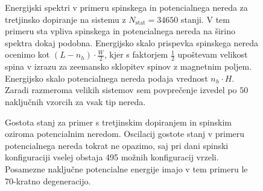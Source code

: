\documentclass[10pt,a4paper]{article}
\begin{document}
 \begin{figure}[H]
\caption{Energijski spektri v primeru spinskega in potencialnega nereda za tretjinsko dopiranje na sistemu z $N_\mathrm{stat}=34650$ stanji. V tem primeru sta vpliva spinskega in potencialnega nereda na širino spektra dokaj podobna. Energijsko skalo prispevka spinskega nereda ocenimo kot $(L-n_h)\cdot \frac{W}{2}$, kjer s faktorjem $\frac{1}{2}$ upoštevam velikost spina v izrazu za zeemansko sklopitev spinov z magnetnim poljem. Energijsko skalo potencialnega nereda podaja vrednost $n_h\cdot H$. Zaradi razmeroma velikih sistemov sem povprečenje izvedel po $50$ naključnih vzorcih za vsak tip nereda.   }
\label{fig:Eigenstates_spin_hole_disorder_12_4_4.pdf}
\end{figure}
 \begin{figure}[H]
\caption{Gostota stanj za primer s tretjinskim dopiranjem in spinskim oziroma potencialnim neredom. Oscilacij gostote stanj v primeru potencialnega nereda tokrat ne opazimo, saj pri dani spinski konfiguraciji vselej obstaja 495 možnih konfiguracij vrzeli. Posamezne naključne potencialne energije imajo v tem primeru le 70-kratno degeneracijo. }
\label{fig:DOS_spin_hole_disorder_12_4_4.pdf}
\end{figure}
\end{document}

